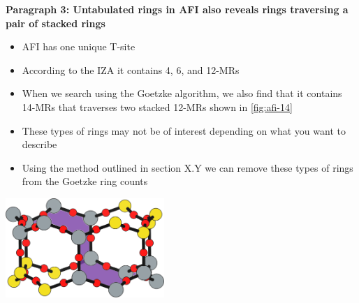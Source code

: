 \documentclass[11pt]{article}
\begin{document}
\textbf{\textbf{Paragraph 3: Untabulated rings in AFI also reveals rings traversing a pair of stacked rings}}
\begin{itemize}
\item AFI has one unique T-site
\item According to the IZA it contains 4, 6, and 12-MRs
\item When we search using the Goetzke algorithm, we also find that it contains 14-MRs that traverses two stacked 12-MRs shown in \cref{fig:afi-14}
\item These types of rings may not be of interest depending on what you want to describe
\item Using the method outlined in section X.Y we can remove these types of rings from the Goetzke ring counts
\end{itemize}
\begin{center}
\includegraphics[width=0.45\textwidth]{../figures/completed-figures/afi-14.pdf}
\end{center}
\end{document}
